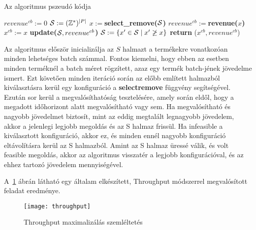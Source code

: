 \begin{algorithm}[H]
\caption{Az algoritmus pszeudó kódja}
\label{throughput}
\begin{algorithmic}[1]
  \State $revenue^{cb}:=  0$
  \State ${\cal S}:=  (\mathbb{Z}^*)^{|P|}$
    \State $x:= $\textbf{select\_remove(}$\cal S$\textbf{)}
        \State $revenue^{cb}:= $\textbf{revenue(}$x$\textbf{)}
        \State $x^{cb}:=  x$
        \State \textbf{update(}${\cal S},revenue^{cb}$\textbf{)}
      \EndIf
    \Else
      \State ${\cal S}:= \{ x'\in{\cal S} \mid x' \not\ge x\}$
    \EndIf
  \EndWhile
    \State \textbf{return} ($x^{cb},revenue^{cb}$)
  \EndIf
\end{algorithmic}
\end{algorithm}

Az algoritmus először inicializálja az $S$ halmazt a termékekre vonatkozóan minden lehetséges batch számmal.
Fontos kiemelni, hogy ebben az esetben minden terméknél a batch méret rögzített, azaz egy termék batch-jének jövedelme ismert.
Ezt követően minden iteráció során az előbb említett halmazból kiválasztásra kerül egy konfiguráció a \textbf{select\textunderscore remove} függvény segítségével.
Ezután sor kerül a megvalósíthatóság tesztelésére, amely során eldől, hogy a megadott időhorizont alatt megvalósítható vagy sem.
Ha megvalósítható és nagyobb jövedelmet biztosít, mint az eddig megtalált legnagyobb jövedelem, akkor a jelenlegi legjobb megoldás és az S halmaz frissül.
Ha infeasible a kiválasztott konfiguráció, akkor ez, és minden ennél nagyobb konfiguráció eltávolításra kerül az S halmazból.
Amint az S halmaz üressé válik, és volt feasible megoldás, akkor az algoritmus visszatér a legjobb konfigurációval, és az ehhez tartozó jövedelem mennyiségével.

A~\ref{throughput1} ábrán látható egy általam elkészített, Throughput módszerrel megvalósított feladat eredménye.
\begin{figure}[H]
\begin{center}
\texttt{[image: throughput]}
\caption{Throughput maximalizálás szemléltetés}
\label{throughput1}
\end{center}
\end{figure}

